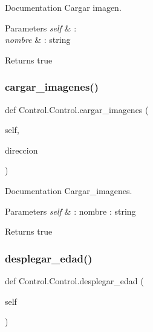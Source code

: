 Documentation Cargar imagen. 


\begin{DoxyParams}{Parameters}
{\em self} & \+: \\
\hline
{\em nombre} & \+: string \\
\hline
\end{DoxyParams}
\begin{DoxyReturn}{Returns}
true 
\end{DoxyReturn}
\mbox{\label{class_control_1_1_control_a56cb5407904ea4d004d3bb3faa7c0549}} 
\subsubsection{\texorpdfstring{cargar\+\_\+imagenes()}{cargar\_imagenes()}}
{\footnotesize\ttfamily def Control.\+Control.\+cargar\+\_\+imagenes (\begin{DoxyParamCaption}\item[{}]{self,  }\item[{}]{direccion }\end{DoxyParamCaption})}



Documentation Cargar\+\_\+imagenes. 


\begin{DoxyParams}{Parameters}
{\em self} & \+:  nombre \+: string \\
\hline
\end{DoxyParams}
\begin{DoxyReturn}{Returns}
true 
\end{DoxyReturn}
\mbox{\label{class_control_1_1_control_a5c05a607e82b93298524f090feaa2397}} 
\subsubsection{\texorpdfstring{desplegar\+\_\+edad()}{desplegar\_edad()}}
{\footnotesize\ttfamily def Control.\+Control.\+desplegar\+\_\+edad (\begin{DoxyParamCaption}\item[{}]{self }\end{DoxyParamCaption})}



